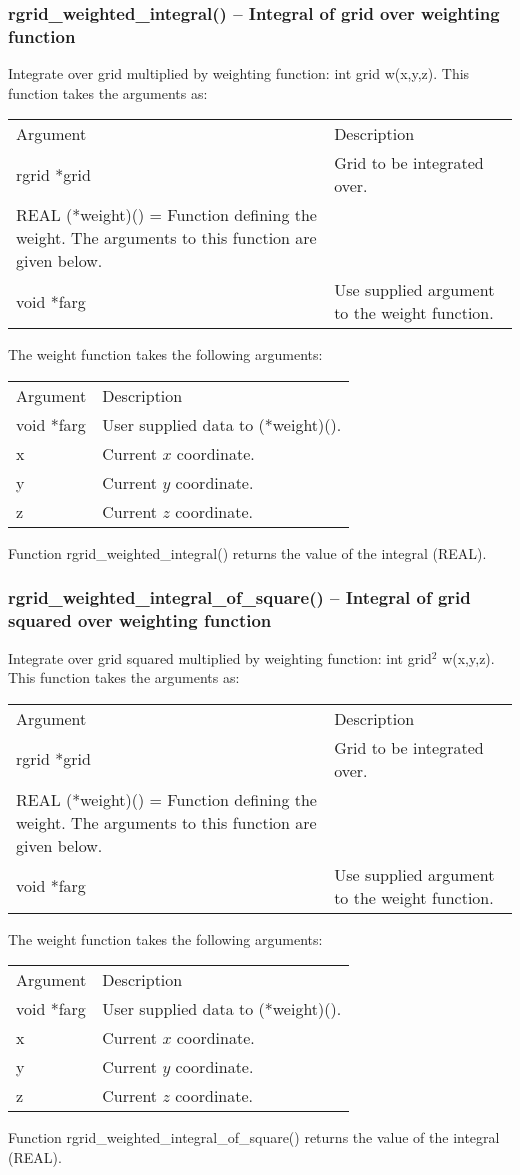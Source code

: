 \documentclass[12pt,letterpaper]{article}
\begin{document}
\subsubsection{rgrid\_weighted\_integral() -- Integral of grid over weighting function}

Integrate over grid multiplied by weighting function: int grid w(x,y,z). This function takes the arguments as:
\begin{longtable}{p{} p{}}
Argument & Description\\
\cline{1-2}
rgrid *grid & Grid to be integrated over.\\
REAL (*weight)() = Function defining the weight. The arguments to this function are given below.\\
void *farg & Use supplied argument to the weight function.\\
\end{longtable}
\noindent
The weight function takes the following arguments:
\begin{longtable}{p{} p{}}
Argument & Description\\
\cline{1-2}
void *farg & User supplied data to (*weight)().\\
x & Current $x$ coordinate.\\
y & Current $y$ coordinate.\\
z & Current $z$ coordinate.\\
\end{longtable}
\noindent
Function rgrid\_weighted\_integral() returns the value of the integral (REAL).

\subsubsection{rgrid\_weighted\_integral\_of\_square() -- Integral of grid squared over weighting function}

Integrate over grid squared multiplied by weighting function: int grid$^2$ w(x,y,z). This function takes the arguments as:
\begin{longtable}{p{} p{}}
Argument & Description\\
\cline{1-2}
rgrid *grid & Grid to be integrated over.\\
REAL (*weight)() = Function defining the weight. The arguments to this function are given below.\\
void *farg & Use supplied argument to the weight function.\\
\end{longtable}
\noindent
The weight function takes the following arguments:
\begin{longtable}{p{} p{}}
Argument & Description\\
\cline{1-2}
void *farg & User supplied data to (*weight)().\\
x & Current $x$ coordinate.\\
y & Current $y$ coordinate.\\
z & Current $z$ coordinate.\\
\end{longtable}
\noindent
Function rgrid\_weighted\_integral\_of\_square() returns the value of the integral (REAL).
\end{document}
